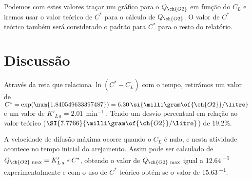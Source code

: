 \documentclass[\mainfilename]{subfiles}
\begin{document}
\begin{sectionBox}
    Podemos com estes valores traçar um gráfico para o \(Q_{\ch{O2}}\) em função do \(C_L\) e iremos usar o valor teórico de \(C^*\) para o cálculo de \(Q_{\ch{O2}}\). O valor de \(C^*\) teórico também será considerado o padrão para \(C^*\) para o resto do relatório.

    \begin{center}
    \end{center}

    
    
    \section*{Discussão}
    Através da reta que relaciona \(\ln(C^*-C_L)\) com o tempo, retirámos um valor de \(C^* = \exp(\num{1.840549633397487}) = 6.30\,\si{\milli\gram\of{\ch{O2}}/\litre}\) e um valor de \(K'_{L\,a} = 2.01\,\si{\min^{-1}}\). Tendo um desvio percentual em relação ao valor teórico (\(\SI{7.7766}{\milli\gram\of{\ch{O2}}/\litre}\)) de 19.2\%. 

    A velocidade de difusão máxima ocorre quando o \(C_L\) é nulo, e nesta atividade acontece no tempo inicial do arejamento. Assim pode ser calculado de \(Q_{\ch{O2}\,\max} = K'_{L\,a}*C^*\), obtendo o valor de \(Q_{\ch{O2}\,\max}\) igual a 12.64\,\si{\min^{-1}} experimentalmente e com o uso de \(C^*\) teórico obtém-se o valor de 15.63\,\si{\min^{-1}}.

\end{sectionBox} 
\end{document}
